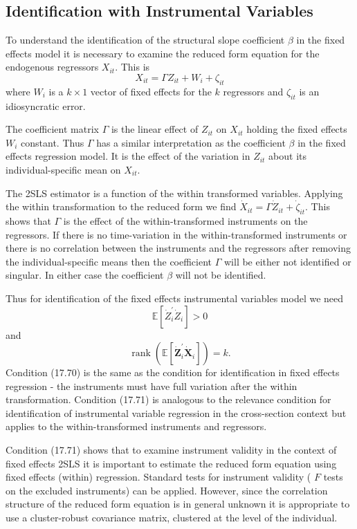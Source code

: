 \documentclass[10pt]{article}
\begin{document}
\subsection{Identification with Instrumental Variables}
To understand the identification of the structural slope coefficient $\beta$ in the fixed effects model it is necessary to examine the reduced form equation for the endogenous regressors $X_{i t}$. This is
$$
X_{i t}=\Gamma Z_{i t}+W_{i}+\zeta_{i t}
$$
where $W_{i}$ is a $k \times 1$ vector of fixed effects for the $k$ regressors and $\zeta_{i t}$ is an idiosyncratic error.

The coefficient matrix $\Gamma$ is the linear effect of $Z_{i t}$ on $X_{i t}$ holding the fixed effects $W_{i}$ constant. Thus $\Gamma$ has a similar interpretation as the coefficient $\beta$ in the fixed effects regression model. It is the effect of the variation in $Z_{i t}$ about its individual-specific mean on $X_{i t}$.

The 2SLS estimator is a function of the within transformed variables. Applying the within transformation to the reduced form we find $\dot{X}_{i t}=\Gamma \dot{Z}_{i t}+\dot{\zeta}_{i t}$. This shows that $\Gamma$ is the effect of the within-transformed instruments on the regressors. If there is no time-variation in the within-transformed instruments or there is no correlation between the instruments and the regressors after removing the individual-specific means then the coefficient $\Gamma$ will be either not identified or singular. In either case the coefficient $\beta$ will not be identified.

Thus for identification of the fixed effects instrumental variables model we need
$$
\mathbb{E}\left[\dot{Z}_{i}^{\prime} \dot{Z}_{i}\right]>0
$$
and
$$
\operatorname{rank}\left(\mathbb{E}\left[\dot{\boldsymbol{Z}}_{i}^{\prime} \dot{\boldsymbol{X}}_{i}\right]\right)=k .
$$
Condition (17.70) is the same as the condition for identification in fixed effects regression - the instruments must have full variation after the within transformation. Condition (17.71) is analogous to the relevance condition for identification of instrumental variable regression in the cross-section context but applies to the within-transformed instruments and regressors.

Condition (17.71) shows that to examine instrument validity in the context of fixed effects 2SLS it is important to estimate the reduced form equation using fixed effects (within) regression. Standard tests for instrument validity ( $F$ tests on the excluded instruments) can be applied. However, since the correlation structure of the reduced form equation is in general unknown it is appropriate to use a cluster-robust covariance matrix, clustered at the level of the individual.
\end{document}
